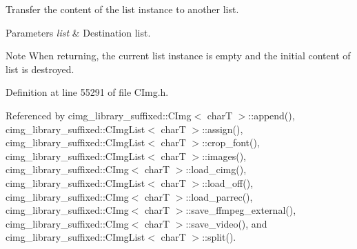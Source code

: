 Transfer the content of the list instance to another list. 


\begin{DoxyParams}{Parameters}
{\em list} & Destination list. \\
\hline
\end{DoxyParams}
\begin{DoxyNote}{Note}
When returning, the current list instance is empty and the initial content of {\ttfamily list} is destroyed. 
\end{DoxyNote}


Definition at line 55291 of file C\+Img.\+h.



Referenced by cimg\+\_\+library\+\_\+suffixed\+::\+C\+Img$<$ char\+T $>$\+::append(), cimg\+\_\+library\+\_\+suffixed\+::\+C\+Img\+List$<$ char\+T $>$\+::assign(), cimg\+\_\+library\+\_\+suffixed\+::\+C\+Img\+List$<$ char\+T $>$\+::crop\+\_\+font(), cimg\+\_\+library\+\_\+suffixed\+::\+C\+Img\+List$<$ char\+T $>$\+::images(), cimg\+\_\+library\+\_\+suffixed\+::\+C\+Img$<$ char\+T $>$\+::load\+\_\+cimg(), cimg\+\_\+library\+\_\+suffixed\+::\+C\+Img\+List$<$ char\+T $>$\+::load\+\_\+off(), cimg\+\_\+library\+\_\+suffixed\+::\+C\+Img$<$ char\+T $>$\+::load\+\_\+parrec(), cimg\+\_\+library\+\_\+suffixed\+::\+C\+Img$<$ char\+T $>$\+::save\+\_\+ffmpeg\+\_\+external(), cimg\+\_\+library\+\_\+suffixed\+::\+C\+Img$<$ char\+T $>$\+::save\+\_\+video(), and cimg\+\_\+library\+\_\+suffixed\+::\+C\+Img\+List$<$ char\+T $>$\+::split().

